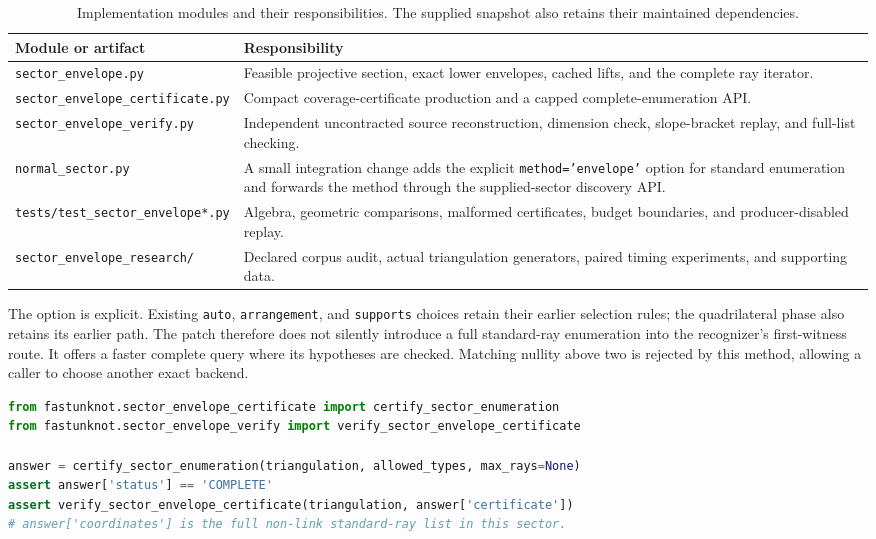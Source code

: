 \documentclass[11pt]{article}
\theoremstyle{definition}
\theoremstyle{remark}
\begin{document}
\begin{table}[htbp]
\centering
\begin{tabular}{@{}>{\raggedright\arraybackslash}p{6.1cm}>{\raggedright\arraybackslash}p{8.1cm}@{}}
\toprule
Module or artifact & Responsibility\\
\midrule
\texttt{sector\_envelope.py} & Feasible projective section, exact lower
envelopes, cached lifts, and the complete ray iterator.\\
\texttt{sector\_envelope\_certificate.py} & Compact coverage-certificate
production and a capped complete-enumeration API.\\
\texttt{sector\_envelope\_verify.py} & Independent uncontracted source
reconstruction, dimension check, slope-bracket replay, and full-list checking.\\
\texttt{normal\_sector.py} & A small integration change adds the explicit
\texttt{method='envelope'} option for standard enumeration and forwards the
method through the supplied-sector discovery API.\\
\texttt{tests/test\_sector\_envelope*.py} & Algebra, geometric comparisons,
malformed certificates, budget boundaries, and producer-disabled replay.\\
\texttt{sector\_envelope\_research/} & Declared corpus audit, actual
triangulation generators, paired timing experiments, and supporting data.\\
\bottomrule
\end{tabular}
\caption{Implementation modules and their responsibilities. The supplied
snapshot also retains their maintained dependencies.}
\end{table}

The option is explicit. Existing \texttt{auto}, \texttt{arrangement}, and
\texttt{supports} choices retain their earlier selection rules; the
quadrilateral phase also retains its earlier path. The patch therefore does
not silently introduce a full standard-ray enumeration into the recognizer's
first-witness route. It offers a faster complete query where its hypotheses
are checked. Matching nullity above two is rejected by this method, allowing
a caller to choose another exact backend.

\begin{lstlisting}[language=Python,caption={Complete enumeration and independent replay.}]
from fastunknot.sector_envelope_certificate import certify_sector_enumeration
from fastunknot.sector_envelope_verify import verify_sector_envelope_certificate

answer = certify_sector_enumeration(triangulation, allowed_types, max_rays=None)
assert answer['status'] == 'COMPLETE'
assert verify_sector_envelope_certificate(triangulation, answer['certificate'])
# answer['coordinates'] is the full non-link standard-ray list in this sector.
\end{lstlisting}
\end{document}
